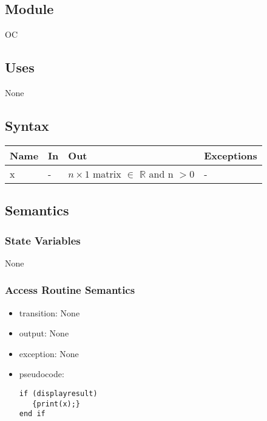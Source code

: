\documentclass[12pt, titlepage]{article}
\begin{document}
\subsection{Module}

OC


\subsection{Uses}

None

\subsection{Syntax}

\begin{center}
\begin{tabular}{p{2cm} p{4cm} p{4cm} p{2cm}}
\hline
\textbf{Name} & \textbf{In} & \textbf{Out} & \textbf{Exceptions} \\
\hline


x & - & $n \times 1$ matrix $\in$ $\mathbb{R}$ and n $> 0$ & - \\
\hline
\end{tabular}
\end{center}

\subsection{Semantics}

\subsubsection{State Variables}

None

\subsubsection{Access Routine Semantics}

\noindent %
\begin{itemize}
\item transition: None%
\item output: None%
\item exception: None%
\item pseudocode: 

\begin{lstlisting}
if (displayresult)
   {print(x);}
end if
\end{lstlisting}

\end{itemize}
\end{document}
